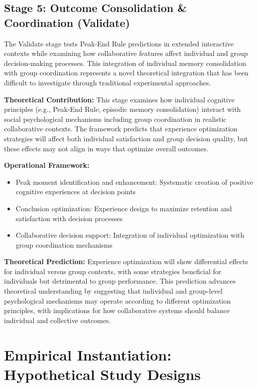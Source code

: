 \documentclass[
  authoryear,
  preprint]{elsarticle}
\providecommand{\tightlist}{%
  \setlength{\itemsep}{0pt}\setlength{\parskip}{0pt}}
\begin{document}
\subsection{Stage 5: Outcome Consolidation \& Coordination
(Validate)}\label{stage-5-outcome-consolidation-coordination-validate}

The Validate stage tests Peak-End Rule predictions in extended
interactive contexts while examining how collaborative features affect
individual and group decision-making processes. This integration of
individual memory consolidation with group coordination represents a
novel theoretical integration that has been difficult to investigate
through traditional experimental approaches.

\textbf{Theoretical Contribution:} This stage examines how individual
cognitive principles (e.g., Peak-End Rule, episodic memory
consolidation) interact with social psychological mechanisms including
group coordination in realistic collaborative contexts. The framework
predicts that experience optimization strategies will affect both
individual satisfaction and group decision quality, but these effects
may not align in ways that optimize overall outcomes.

\textbf{Operational Framework:}

\begin{itemize}
\tightlist
\item
  Peak moment identification and enhancement: Systematic creation of
  positive cognitive experiences at decision points
\item
  Conclusion optimization: Experience design to maximize retention and
  satisfaction with decision processes
\item
  Collaborative decision support: Integration of individual optimization
  with group coordination mechanisms
\end{itemize}

\textbf{Theoretical Prediction:} Experience optimization will show
differential effects for individual versus group contexts, with some
strategies beneficial for individuals but detrimental to group
performance. This prediction advances theoretical understanding by
suggesting that individual and group-level psychological mechanisms may
operate according to different optimization principles, with
implications for how collaborative systems should balance individual and
collective outcomes.

\section{Empirical Instantiation: Hypothetical Study
Designs}\label{empirical-instantiation-hypothetical-study-designs}
\end{document}
